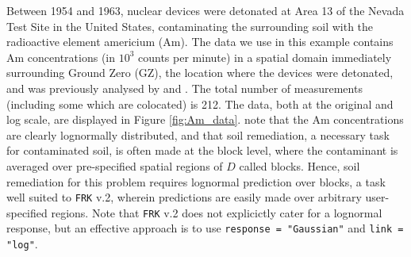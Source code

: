 \documentclass[12pt,a4paper]{article}
\begin{document}
%
%





Between 1954 and 1963, nuclear devices were detonated at Area 13 of the Nevada Test Site in the United States, contaminating the surrounding soil with the radioactive element americium (Am). 
The data we use in this example contains 
 Am concentrations (in $10^3$ counts per minute) in a spatial domain immediately surrounding Ground Zero (GZ), the location where the devices were detonated, and was previously analysed by \cite{Huang_2009_multivar_intrinsic_rand_functions_cokriging} and \cite{Paul_Cressie_2011_lognormal_kriging_block_prediction}. 
The total number of measurements (including some which are colocated) is 212.
The data, both at the original and log scale, are displayed in Figure \ref{fig:Am_data}. 
\cite{Paul_Cressie_2011_lognormal_kriging_block_prediction} note that the Am concentrations are clearly lognormally distributed, and that soil remediation, a necessary task for contaminated soil, is often made at the block level, where the contaminant is averaged over pre-specified spatial regions of $D$ called blocks.
Hence, soil remediation for this problem requires lognormal prediction over blocks, a task well suited to \texttt{FRK} v.2, wherein predictions are easily made over arbitrary user-specified regions. 
 Note that \texttt{FRK} v.2 does not explicictly cater for a lognormal response, but an effective approach is to use \texttt{response = "Gaussian"} and \texttt{link = "log"}. 
\end{document}
